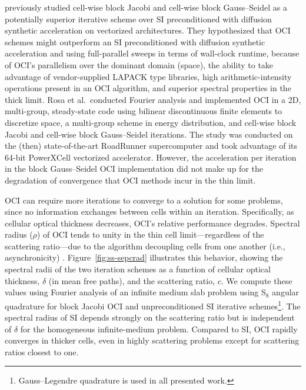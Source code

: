\cite{rosa_cellwise_2013} previously studied cell-wise block Jacobi and cell-wise block Gauss--Seidel as a potentially superior iterative scheme over SI preconditioned with diffusion synthetic acceleration on vectorized architectures.
They hypothesized that OCI schemes might outperform an SI preconditioned with diffusion synthetic acceleration and using full-parallel sweeps in terms of wall-clock runtime, because of OCI's parallelism over the dominant domain (space), the ability to take advantage of vendor-supplied LAPACK type libraries, high arithmetic-intensity operations present in an OCI algorithm, and superior spectral properties in the thick limit.
Rosa et al.\ conducted Fourier analysis and implemented OCI in a 2D, multi-group, steady-state code using bilinear discontinuous finite elements to discretize space, a multi-group scheme in energy distribution, and cell-wise block Jacobi and cell-wise block Gauss--Seidel iterations.
The study was conducted on the (then) state-of-the-art RoadRunner supercomputer and took advantage of its 64-bit PowerXCell vectorized accelerator.
However, the acceleration per iteration in the block Gauss--Seidel OCI implementation did not make up for the degradation of convergence that OCI methods incur in the thin limit.

OCI can require more iterations to converge to a solution for some problems, since no information exchanges between cells within an iteration.
Specifically, as cellular optical thickness decreases, OCI's relative performance degrades. %
Spectral radius ($\rho$) of OCI tends to unity in the thin cell limit---regardless of the scattering ratio---due to the algorithm decoupling cells from one another (i.e., asynchronicity) \cite{rosa_cellwise_2013, hoagland_hybrid_2021, man1994parallel}. 
Figure~\ref{fig:ss-sepcrad} illustrates this behavior, showing the spectral radii of the two iteration schemes as a function of cellular optical thickness, $\delta$ (in mean free paths), and the scattering ratio, $c$.
We compute these values using Fourier analysis of an infinite medium slab problem using S$_{8}$ angular quadrature for block Jacobi OCI and unpreconditioned SI iterative schemes\footnote{Gauss--Legendre quadrature is used in all presented work.}.
The spectral radius of SI depends strongly on the scattering ratio but is independent of $\delta$ for the homogeneous infinite-medium problem. 
Compared to SI, OCI rapidly converges in thicker cells, even in highly scattering problems except for scattering ratios closest to one.

